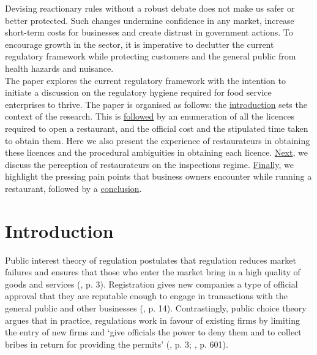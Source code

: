 \documentclass[a4paper, 12pt, twoside]{article}
\begin{document}
                    Devising reactionary rules without a robust debate does not make us safer or better protected. Such changes undermine confidence in any market, increase short-term costs for businesses and create distrust in government actions. To encourage 
growth in the sector, it is imperative to declutter the current regulatory framework while protecting customers and the general public from health hazards and nuisance. \\
                    
                   The paper explores the current regulatory framework with the intention to initiate a discussion on the regulatory hygiene required for food service enterprises to thrive. The paper is organised as follows: the \hyperref[intro]{introduction} sets the context of 
the research. This is \hyperref[sec:1]{followed} by an enumeration of all the licences required to open a restaurant, and the official cost and the stipulated time taken to obtain them. Here we also present the experience of restaurateurs in obtaining these licences 
and the procedural ambiguities in obtaining each licence. \hyperref[sec:2]{Next}, we discuss the perception of restaurateurs on the inspections regime. \hyperref[sec:3]{Finally}, we highlight the pressing pain points that business owners encounter while running a 
restaurant, followed by a \hyperref[end]{conclusion}.   

                    \newpage
                    \section{Introduction}
                    \label{intro}
                    Public interest theory of regulation postulates that regulation reduces market failures and ensures that those who enter the market bring in a high quality of goods and services (\cite{hertog2010}, p. 3). Registration gives new companies a type of official 
approval that they are reputable enough to engage in transactions with the general public and other businesses (\cite{sri1999}, p. 14). Contrastingly, public choice theory argues that in practice, regulations work in favour of existing firms by limiting the entry of new firms and ‘give officials the power to deny them and to collect bribes in return for providing the permits’ (\cite{stigler1971theory}, p. 3; \cite{shleifer1993corruption}, p. 601).\\ 
                    
\end{document}
